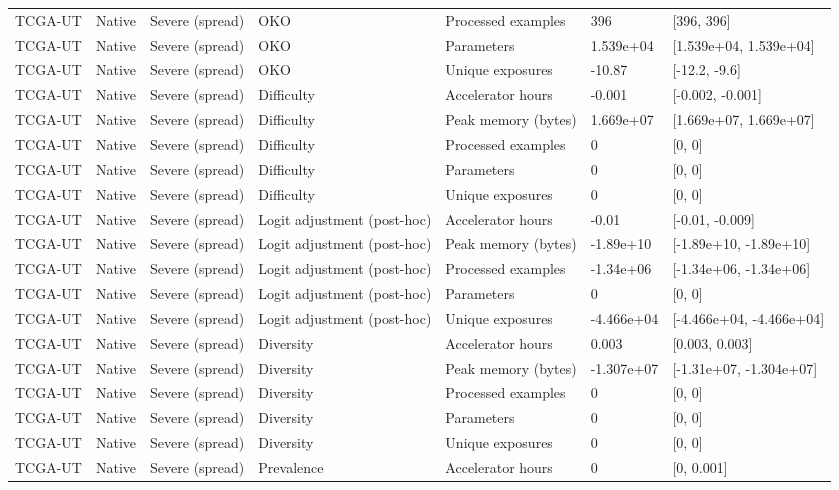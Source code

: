 \begin{longtable}{lllllll}
TCGA-UT & Native & Severe (spread) & OKO & Processed examples & 396 & [396, 396] \\
TCGA-UT & Native & Severe (spread) & OKO & Parameters & 1.539e+04 & [1.539e+04, 1.539e+04] \\
TCGA-UT & Native & Severe (spread) & OKO & Unique exposures & -10.87 & [-12.2, -9.6] \\
TCGA-UT & Native & Severe (spread) & Difficulty & Accelerator hours & -0.001 & [-0.002, -0.001] \\
TCGA-UT & Native & Severe (spread) & Difficulty & Peak memory (bytes) & 1.669e+07 & [1.669e+07, 1.669e+07] \\
TCGA-UT & Native & Severe (spread) & Difficulty & Processed examples & 0 & [0, 0] \\
TCGA-UT & Native & Severe (spread) & Difficulty & Parameters & 0 & [0, 0] \\
TCGA-UT & Native & Severe (spread) & Difficulty & Unique exposures & 0 & [0, 0] \\
TCGA-UT & Native & Severe (spread) & Logit adjustment (post-hoc) & Accelerator hours & -0.01 & [-0.01, -0.009] \\
TCGA-UT & Native & Severe (spread) & Logit adjustment (post-hoc) & Peak memory (bytes) & -1.89e+10 & [-1.89e+10, -1.89e+10] \\
TCGA-UT & Native & Severe (spread) & Logit adjustment (post-hoc) & Processed examples & -1.34e+06 & [-1.34e+06, -1.34e+06] \\
TCGA-UT & Native & Severe (spread) & Logit adjustment (post-hoc) & Parameters & 0 & [0, 0] \\
TCGA-UT & Native & Severe (spread) & Logit adjustment (post-hoc) & Unique exposures & -4.466e+04 & [-4.466e+04, -4.466e+04] \\
TCGA-UT & Native & Severe (spread) & Diversity & Accelerator hours & 0.003 & [0.003, 0.003] \\
TCGA-UT & Native & Severe (spread) & Diversity & Peak memory (bytes) & -1.307e+07 & [-1.31e+07, -1.304e+07] \\
TCGA-UT & Native & Severe (spread) & Diversity & Processed examples & 0 & [0, 0] \\
TCGA-UT & Native & Severe (spread) & Diversity & Parameters & 0 & [0, 0] \\
TCGA-UT & Native & Severe (spread) & Diversity & Unique exposures & 0 & [0, 0] \\
TCGA-UT & Native & Severe (spread) & Prevalence & Accelerator hours & 0 & [0, 0.001] \\

\end{longtable}
